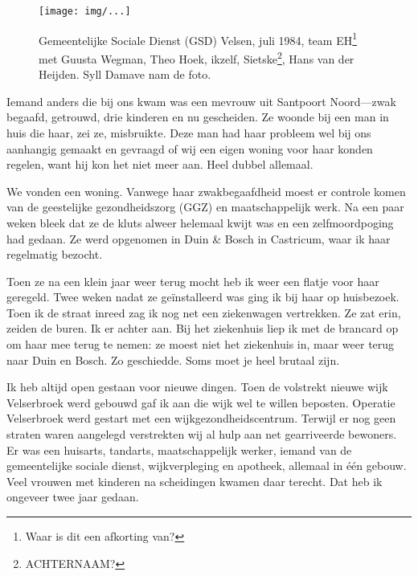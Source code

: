 \documentclass[12pt,twoside, openright]{memoir}
\begin{document}


\begin{figure}[t]
\texttt{[image: img/...]}
\caption{Gemeentelijke Sociale Dienst (GSD) Velsen, juli 1984, team EH\footnote{Waar is dit een afkorting van?} met Guusta Wegman, Theo Hoek, ikzelf, Sietske\footnote{ACHTERNAAM?}, Hans van der Heijden. Syll Damave nam de foto.}
\end{figure}

Iemand anders die bij ons kwam was een mevrouw uit Santpoort Noord---zwak begaafd, getrouwd, drie kinderen en nu gescheiden. Ze woonde bij een man in huis die haar, zei ze, misbruikte. Deze man had haar probleem wel bij ons aanhangig gemaakt en gevraagd of wij een eigen woning voor haar konden regelen, want hij kon het niet meer aan. Heel dubbel allemaal. 

We vonden een woning. Vanwege haar zwakbegaafdheid moest er controle komen van de geestelijke gezondheidszorg (GGZ) en maatschappelijk werk. Na een paar weken bleek dat ze de kluts alweer helemaal kwijt was en een zelfmoordpoging had gedaan. Ze werd opgenomen in Duin \& Bosch in Castricum, waar ik haar regelmatig bezocht. 

Toen ze na een klein jaar weer terug mocht heb ik weer een flatje voor haar geregeld. Twee weken nadat ze geïnstalleerd was ging ik bij haar op huisbezoek. Toen ik de straat inreed zag ik nog net een ziekenwagen vertrekken. Ze zat erin, zeiden de buren. Ik er achter aan. Bij het ziekenhuis liep ik met de brancard op om haar mee terug te nemen: ze moest niet het ziekenhuis in, maar weer terug naar Duin en Bosch. Zo geschiedde. Soms moet je heel brutaal zijn.

Ik heb altijd open gestaan voor nieuwe dingen. Toen de volstrekt nieuwe wijk Velserbroek werd gebouwd gaf ik aan die wijk wel te willen beposten. Operatie Velserbroek werd gestart met een wijkgezondheidscentrum. Terwijl er nog geen straten waren aangelegd verstrekten wij al hulp aan net gearriveerde bewoners. Er was een huisarts, tandarts, maatschappelijk werker, iemand van de gemeentelijke sociale dienst, wijkverpleging en apotheek, allemaal in één gebouw. Veel vrouwen met kinderen na scheidingen kwamen daar terecht. Dat heb ik ongeveer twee jaar gedaan. 
\end{document}
